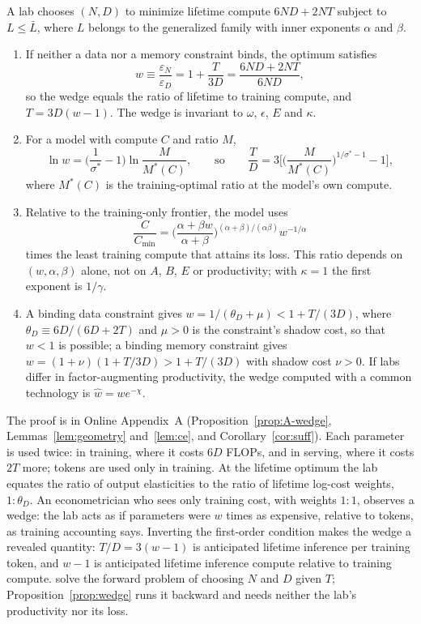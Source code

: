 \begin{proposition}\label{prop:wedge}
A lab chooses $(N,D)$ to minimize lifetime compute $6ND+2NT$ subject to $L\le\bar L$, where $L$ belongs to the
generalized family with inner exponents $\alpha$ and $\beta$.
\begin{enumerate}
\item[(i)] If neither a data nor a memory constraint binds, the optimum satisfies
\[
w\equiv\frac{\varepsilon_N}{\varepsilon_D}=1+\frac{T}{3D}=\frac{6ND+2NT}{6ND},
\]
so the wedge equals the ratio of lifetime to training compute, and $T=3D(w-1)$. The wedge is invariant to
$\omega$, $\epsilon$, $E$ and $\kappa$.
\item[(ii)] For a model with compute $C$ and ratio $M$,
\[
\ln w=\Big(\frac{1}{\sigma^*}-1\Big)\ln\frac{M}{M^*(C)},\qquad\text{so}\qquad
\frac TD=3\bigg[\Big(\frac{M}{M^*(C)}\Big)^{1/\sigma^*-1}-1\bigg],
\]
where $M^*(C)$ is the training-optimal ratio at the model's own compute.
\item[(iii)] Relative to the training-only frontier, the model uses
\[
\frac{C}{C_{\min}}=\Big(\frac{\alpha+\beta w}{\alpha+\beta}\Big)^{(\alpha+\beta)/(\alpha\beta)}w^{-1/\alpha}
\]
times the least training compute that attains its loss. This ratio depends on $(w,\alpha,\beta)$ alone, not on
$A$, $B$, $E$ or productivity; with $\kappa=1$ the first exponent is $1/\gamma$.
\item[(iv)] A binding data constraint gives $w=1/(\theta_D+\mu)<1+T/(3D)$, where $\theta_D\equiv6D/(6D+2T)$ and
$\mu>0$ is the constraint's shadow cost, so that $w<1$ is possible; a binding memory constraint gives
$w=(1+\nu)(1+T/3D)>1+T/(3D)$ with shadow cost $\nu>0$. If labs differ in factor-augmenting productivity, the wedge
computed with a common technology is $\hat w=we^{-\chi}$.
\end{enumerate}
\end{proposition}

\noindent The proof is in Online Appendix~A (Proposition~\ref{prop:A-wedge}, Lemmas~\ref{lem:geometry}
and~\ref{lem:ce}, and Corollary~\ref{cor:suff}). Each parameter is used twice: in training, where it costs $6D$ FLOPs, and in serving, where it
costs $2T$ more; tokens are used only in training. At the lifetime optimum the lab equates the ratio of output
elasticities to the ratio of lifetime log-cost weights, $1:\theta_D$. An econometrician who sees only training cost,
with weights $1:1$, observes a wedge: the lab acts as if parameters were $w$ times as expensive, relative to tokens,
as training accounting says. Inverting the first-order condition makes the wedge a revealed quantity: $T/D=3(w-1)$ is
anticipated lifetime inference per training token, and $w-1$ is anticipated lifetime inference compute relative to
training compute. \citet{sardana2024beyond} solve the forward problem of choosing $N$ and $D$ given $T$;
Proposition~\ref{prop:wedge} runs it backward and needs neither the lab's productivity nor its loss.


